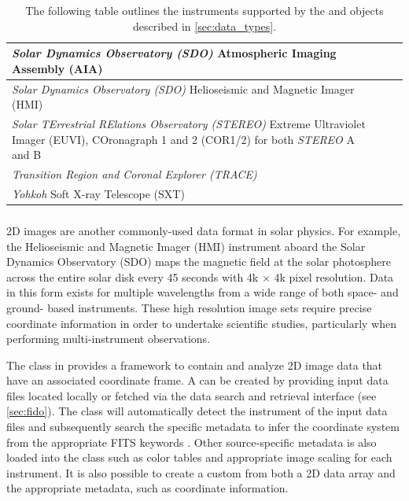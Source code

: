 \begin{table}
\begin{center}
\begin{tabular}{|p{12cm}|c|c|}
\hline
\textit{Solar Dynamics Observatory (SDO)} Atmospheric Imaging Assembly (AIA) & \citet{lemen2012} \\
\hline
\textit{Solar Dynamics Observatory (SDO)} Helioseismic and Magnetic Imager (HMI) & \citet{schou12}  \\
\hline
\textit{Solar TErrestrial RElations Observatory (STEREO)} Extreme Ultraviolet Imager (EUVI), COronagraph 1 and 2 (COR1/2) for both \textit{STEREO} A and B & \citet{howard2008sun} \\
\hline
\textit{Transition Region and Coronal Explorer (TRACE)}  & \citet{handy99}  \\
\hline
\textit{Yohkoh} Soft X-ray Telescope (SXT) & \citet{tsuneta1991soft}  \\
\hline
\end{tabular}
\end{center}
\caption{The following table outlines the instruments supported by the \Timeseries and \Map objects described in \autoref{sec:data_types}.}
\label{tab:instruments}
\end{table}

\subsubsection{\Map}
\label{sec:map}
2D images are another commonly-used data format in solar physics. 
For example, the Helioseismic and Magnetic Imager (HMI) instrument aboard the Solar Dynamics Observatory (SDO) maps the magnetic field at the solar photosphere across the entire solar disk every 45 seconds with 4k $\times$ 4k pixel resolution.
Data in this form exists for multiple wavelengths from a wide range of both space- and ground- based instruments.
These high resolution image sets require precise coordinate information in order to undertake scientific studies, particularly when performing multi-instrument observations. 

The \Map class in \sunpypkg provides a framework to contain and analyze 2D image data that have an associated coordinate frame. 
A \Map can be created by providing input data files located locally or fetched via the \sunpypkg data search and retrieval interface \Fido (see \autoref{sec:fido}).
The \Map class will automatically detect the instrument of the input data files and subsequently search the specific metadata to infer the coordinate system from the appropriate FITS keywords \citep{refId0, 2006A&A...449..791T}.
Other source-specific metadata is also loaded into the \Map class such as color tables and appropriate image scaling for each instrument.
It is also possible to create a custom \Map from both a 2D data array and the appropriate metadata, such as coordinate information.

